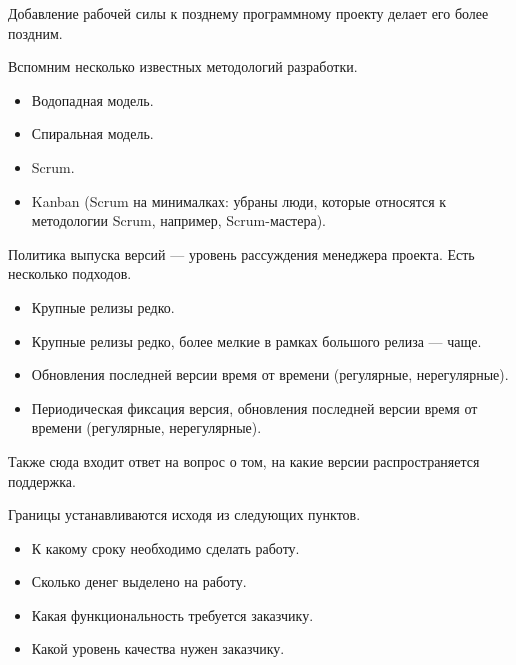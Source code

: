     \begin{Def}
        Добавление рабочей силы к позднему программному проекту делает его более поздним.
    \end{Def}


    \begin{Rem}
        Вспомним несколько известных методологий разработки.
        \begin{itemize}
            \item Водопадная модель.
            \item Спиральная модель.
            \item Scrum.
            \item Kanban (Scrum на минималках: убраны люди, которые относятся к методологии Scrum, например, Scrum-мастера).
        \end{itemize}
    \end{Rem}


    \begin{Rem}
        Политика выпуска версий --- уровень рассуждения менеджера проекта. Есть несколько подходов.
        \begin{itemize}
            \item Крупные релизы редко.
            \item Крупные релизы редко, более мелкие в рамках большого релиза --- чаще.
            \item Обновления последней версии время от времени (регулярные, нерегулярные).
            \item Периодическая фиксация версия, обновления последней версии время от времени (регулярные, нерегулярные).
        \end{itemize}
        
        Также сюда входит ответ на вопрос о том, на какие версии распространяется поддержка.
    \end{Rem}

    \begin{Rem}
        Границы устанавливаются исходя из следующих пунктов.
        \begin{itemize}
            \item К какому сроку необходимо сделать работу.
            \item Сколько денег выделено на работу.
            \item Какая функциональность требуется заказчику.
            \item Какой уровень качества нужен заказчику.
        \end{itemize}
    \end{Rem}

